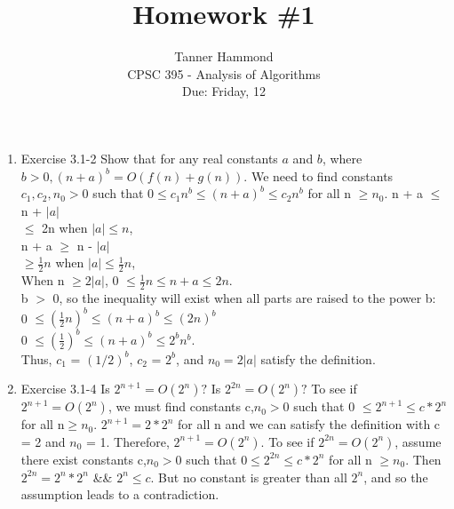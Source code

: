 \documentclass[12pt]{article}
\begin{document}
 
 
 
\title{Homework \#1}%
\author{Tanner Hammond\\ %
CPSC 395 - Analysis of Algorithms
\\ Due: Friday, 12} %
\date{}
\maketitle

\begin{enumerate}
\item Exercise 3.1-2
\newline Show that for any real constants $a$ and $b$, where $b > 0, (n + a)^b = O(f(n) + g(n)).$
\newline We need to find constants $c_1,c_2,n_0 > 0$ such that $0 \leq c_1n^b \leq (n+a)^b \leq c_2n^b$ for all n $\geq n_0$.
\newline n + a $\leq$ n + $|a|$ \\
\hspace*{10mm} $ \leq$ 2n when $|a| \leq n$, \\
n + a $\geq$ n - $|a|$ \\
\hspace*{10mm} $\geq \frac{1}{2}n$ when $|a| \leq \frac{1}{2}n$, \\
When n $\geq 2|a|$, 0 $\leq \frac{1}{2}n \leq n + a \leq 2n$.\\
b $>$ 0, so the inequality will exist when all parts are raised to the power b: \\
0 $\leq (\frac{1}{2}n)^b \leq (n + a)^b \leq (2n)^b$ \\
0 $\leq (\frac{1}{2})^b \leq (n + a)^b \leq 2^bn^b$. \\
Thus, $c_1$ = $(1/2)^b$, $c_2$ = $2^b$, and $n_0 = 2|a|$ satisfy the definition.

\item Exercise 3.1-4
\newline Is $2^{n+1} = O({2^n})?$ Is $2^{2n} = O(2^n)?$
\newline To see if $2^{n+1} = O(2^n)$, we must find constants c,$n_0 > 0$ such that 0 $\leq 2^{n+1} \leq c * 2^n$ for all n$\geq n_0$. $2^{n+1} = 2 * 2^n$ for all n and we can satisfy the definition with c = 2 and $n_0$ = 1. Therefore, $2^{n+1} = O({2^n})$.
\newline To see if $2^{2n} = O(2^n)$, assume there exist constants c,$n_0 >$0 such that $0 \leq 2^{2n} \leq c*2^n$ for all n $\geq n_0$. Then $2^{2n} = 2^n * 2^n$ &\rightarrow& $2^n \leq c$. But no constant is greater than all $2^n$, and so the assumption leads to a contradiction.


\end{enumerate}
\end{document}
